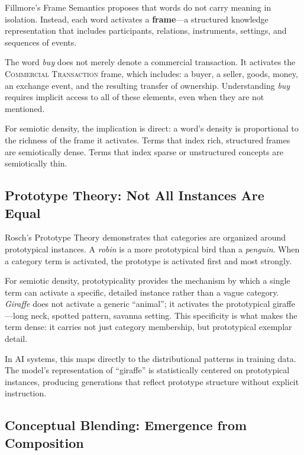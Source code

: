 \documentclass[12pt,a4paper]{article}
\begin{document}
Fillmore's Frame Semantics \cite{fillmore1982} proposes that words do not carry meaning in isolation.
Instead, each word activates a \textbf{frame}---a structured knowledge representation that includes participants, relations, instruments, settings, and sequences of events.

The word \textit{buy} does not merely denote a commercial transaction.
It activates the \textsc{Commercial Transaction} frame, which includes: a buyer, a seller, goods, money, an exchange event, and the resulting transfer of ownership.
Understanding \textit{buy} requires implicit access to all of these elements, even when they are not mentioned.

For semiotic density, the implication is direct: a word's density is proportional to the richness of the frame it activates.
Terms that index rich, structured frames are semiotically dense.
Terms that index sparse or unstructured concepts are semiotically thin.

\subsection{Prototype Theory: Not All Instances Are Equal}
\label{subsec:prototypes}

Rosch's Prototype Theory \cite{rosch1975} demonstrates that categories are organized around prototypical instances.
A \textit{robin} is a more prototypical bird than a \textit{penguin}.
When a category term is activated, the prototype is activated first and most strongly.

For semiotic density, prototypicality provides the mechanism by which a single term can activate a specific, detailed instance rather than a vague category.
\textit{Giraffe} does not activate a generic ``animal''; it activates the prototypical giraffe---long neck, spotted pattern, savanna setting.
This specificity is what makes the term dense: it carries not just category membership, but prototypical exemplar detail.

In AI systems, this maps directly to the distributional patterns in training data.
The model's representation of ``giraffe'' is statistically centered on prototypical instances, producing generations that reflect prototype structure without explicit instruction.

\subsection{Conceptual Blending: Emergence from Composition}
\label{subsec:blending}
\end{document}
